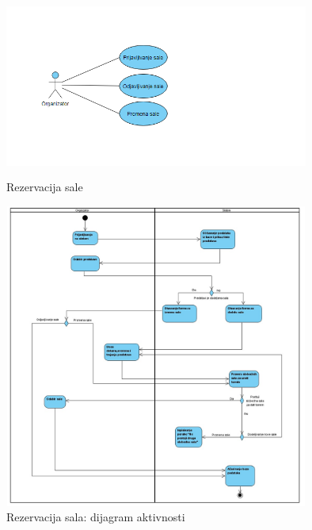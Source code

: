 \documentclass[a4paper]{article}
\begin{document}
\begin{figure}[H]
  \begin{center}
      \includegraphics[width=100mm,height=60mm]{../images/usecase_rezervacija_sale.png}
  \end{center}
  \caption{Rezervacija sale}
  \label{usecase_rezervacija_sale}
\end{figure}

\begin{figure}[H]
  \begin{center}
      \includegraphics[width=100mm,height=100mm]{../images/activity_rezervacija_sala.jpg}
  \end{center}
  \caption{Rezervacija sala: dijagram aktivnosti}
  \label{activity_rezervacija_sala}
\end{figure}
\end{document}

